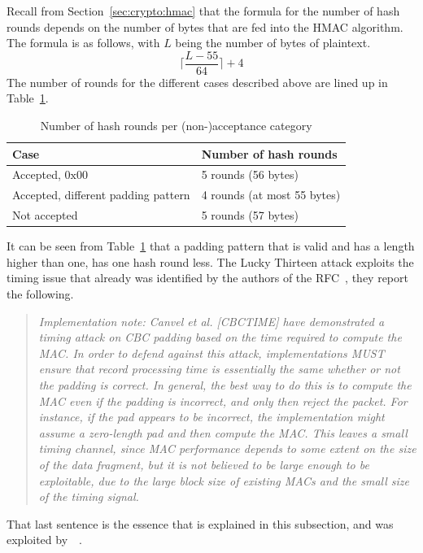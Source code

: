 \documentclass[10pt,conference,a4paper]{IEEEtran}
\begin{document}
Recall from Section~\ref{sec:crypto:hmac} that the formula for the number of hash rounds depends on the number of bytes that are fed into the HMAC algorithm. The formula is as follows, with $L$ being the number of bytes of plaintext.
\[ \lceil \frac{L - 55}{64} \rceil + 4 \]
The number of rounds for the different cases described above are lined up in Table~\ref{sec:lucky:bandage:table}.
\begin{table}[h]
\begin{tabular}{l|l}
Case & Number of hash rounds  \\ \hline 
Accepted, $0\text{x}00$ & 5 rounds (56 bytes)  \\
Accepted, different padding pattern & 4 rounds (at most 55 bytes)  \\
Not accepted & 5 rounds (57 bytes) \\
\end{tabular}
\caption{Number of hash rounds per (non-)acceptance category}
\label{sec:lucky:bandage:table}
\end{table}
It can be seen from Table~\ref{sec:lucky:bandage:table} that a padding pattern that is valid and has a length higher than one, has one hash round less. The Lucky Thirteen attack exploits the timing issue that already was identified by the authors of the RFC~\citeauthor{ietf2008transport}, they report the following.
\begin{quote}
\textit{Implementation note: Canvel et al. [CBCTIME] have demonstrated a timing attack on CBC padding based on the time required to compute the MAC.  In order to defend against this attack, implementations MUST ensure that record processing time is essentially the same whether or not the padding is correct.  In general, the best way to do this is to compute the MAC even if the padding is incorrect, and only then reject the packet.  For instance, if the pad appears to be incorrect, the implementation might assume a zero-length pad and then compute the MAC.  This leaves a small timing channel, since MAC performance depends to some extent on the size of the data fragment, but it is not believed to be large enough to be exploitable, due to the large block size of existing MACs and the small size of the timing signal.}
\end{quote}
That last sentence is the essence that is explained in this subsection, and was exploited by~\citeauthor{alfardan2013lucky}~\cite{alfardan2013lucky}.

\end{document}
